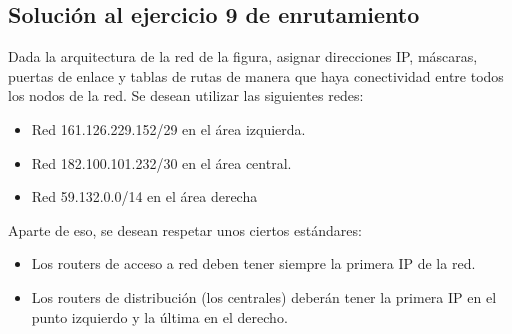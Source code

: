 \documentclass[letterpaper,10pt,spanish]{sphinxmanual}
\begin{document}
\subsection{Solución al ejercicio 9 de enrutamiento}
\label{\detokenize{t2_integracion_elementos/ejercicios_subredes_ipv4/ejercicios_dos_router:solucion-al-ejercicio-9-de-enrutamiento}}
\sphinxAtStartPar
Dada la arquitectura de la red de la figura, asignar direcciones IP, máscaras, puertas de enlace y tablas de rutas de manera que haya conectividad entre todos
los nodos de la red. Se desean utilizar las siguientes redes:
\begin{itemize}
\item {} 
\sphinxAtStartPar
Red 161.126.229.152/29 en el área izquierda.

\item {} 
\sphinxAtStartPar
Red 182.100.101.232/30 en el área central.

\item {} 
\sphinxAtStartPar
Red 59.132.0.0/14 en el área derecha

\end{itemize}

\begin{figure}[htbp]
\centering

\noindent{}
\end{figure}

\sphinxAtStartPar
Aparte de eso, se desean respetar unos ciertos estándares:
\begin{itemize}
\item {} 
\sphinxAtStartPar
Los routers de acceso a red deben tener siempre la primera IP de la red.

\item {} 
\sphinxAtStartPar
Los routers de distribución (los centrales) deberán tener la primera IP en el punto izquierdo y la última en el derecho.

\end{itemize}
\end{document}
